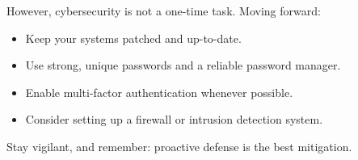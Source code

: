\documentclass{article}
\begin{document}
\noindent
However, cybersecurity is not a one-time task. Moving forward:
\begin{itemize}
    \item Keep your systems patched and up-to-date.
    \item Use strong, unique passwords and a reliable password manager.
    \item Enable multi-factor authentication whenever possible.
    \item Consider setting up a firewall or intrusion detection system.
\end{itemize}

\noindent 
Stay vigilant, and remember: proactive defense is the best mitigation.


\end{document}
